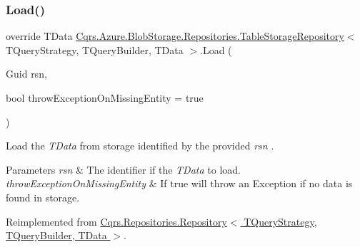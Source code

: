 \subsubsection{\texorpdfstring{Load()}{Load()}}
{\footnotesize\ttfamily override T\+Data \hyperlink{classCqrs_1_1Azure_1_1BlobStorage_1_1Repositories_1_1TableStorageRepository}{Cqrs.\+Azure.\+Blob\+Storage.\+Repositories.\+Table\+Storage\+Repository}$<$ T\+Query\+Strategy, T\+Query\+Builder, T\+Data $>$.Load (\begin{DoxyParamCaption}\item[{Guid}]{rsn,  }\item[{bool}]{throw\+Exception\+On\+Missing\+Entity = {\ttfamily true} }\end{DoxyParamCaption})\hspace{0.3cm}{\ttfamily [virtual]}}



Load the {\itshape T\+Data}  from storage identified by the provided {\itshape rsn} . 


\begin{DoxyParams}{Parameters}
{\em rsn} & The identifier if the {\itshape T\+Data}  to load.\\
\hline
{\em throw\+Exception\+On\+Missing\+Entity} & If true will throw an Exception if no data is found in storage.\\
\hline
\end{DoxyParams}


Reimplemented from \hyperlink{classCqrs_1_1Repositories_1_1Repository_a444e9dfe4710be90940dbb6dec9d856f_a444e9dfe4710be90940dbb6dec9d856f}{Cqrs.\+Repositories.\+Repository$<$ T\+Query\+Strategy, T\+Query\+Builder, T\+Data $>$}.

